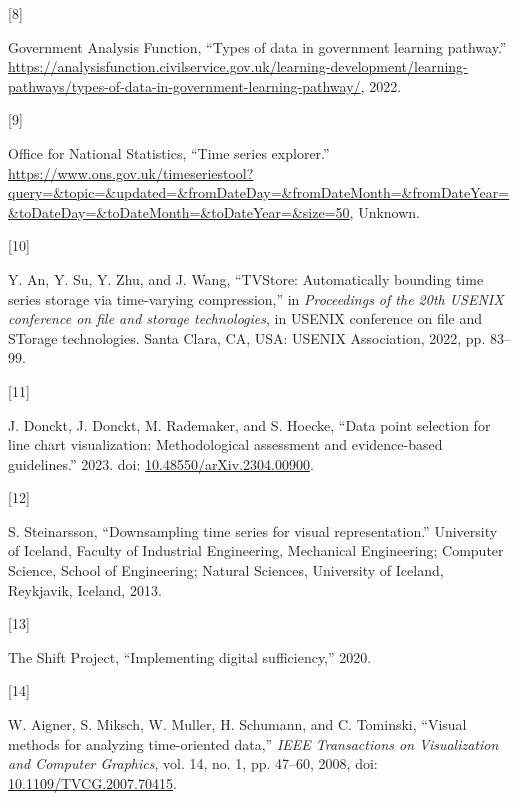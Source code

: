 \documentclass{article}
\newlength{\cslhangindent}
\newlength{\csllabelwidth}
\newlength{\cslentryspacingunit} %
\newenvironment{CSLReferences}[2] %
 {%
  \setlength{\parindent}{0pt}
  \ifodd #1
  \let\oldpar\par
  \def\par{\hangindent=\cslhangindent\oldpar}
  \fi
  \setlength{\parskip}{#2\cslentryspacingunit}
 }%
 {}
\newcommand{\CSLLeftMargin}[1]{\parbox[t]{\csllabelwidth}{#1}}
\newcommand{\CSLRightInline}[1]{\parbox[t]{\linewidth - \csllabelwidth}{#1}\break}
\begin{document}
\begin{CSLReferences}{0}{0}
\leavevmode{}%
\CSLLeftMargin{{[}8{]} }%
\CSLRightInline{Government Analysis Function, {``Types of data in
government learning pathway.''}
\url{https://analysisfunction.civilservice.gov.uk/learning-development/learning-pathways/types-of-data-in-government-learning-pathway/},
2022.}

\leavevmode{}%
\CSLLeftMargin{{[}9{]} }%
\CSLRightInline{Office for National Statistics, {``Time series
explorer.''}
\url{https://www.ons.gov.uk/timeseriestool?query=\&topic=\&updated=\&fromDateDay=\&fromDateMonth=\&fromDateYear=\&toDateDay=\&toDateMonth=\&toDateYear=\&size=50},
Unknown.}

\leavevmode{}%
\CSLLeftMargin{{[}10{]} }%
\CSLRightInline{Y. An, Y. Su, Y. Zhu, and J. Wang, {``TVStore:
Automatically bounding time series storage via time-varying
compression,''} in \emph{Proceedings of the 20th USENIX conference on
file and storage technologies}, in USENIX conference on file and STorage
technologies. Santa Clara, CA, USA: USENIX Association, 2022, pp.
83--99.}

\leavevmode{}%
\CSLLeftMargin{{[}11{]} }%
\CSLRightInline{J. Donckt, J. Donckt, M. Rademaker, and S. Hoecke,
{``Data point selection for line chart visualization: Methodological
assessment and evidence-based guidelines.''} 2023. doi:
\href{https://doi.org/10.48550/arXiv.2304.00900}{10.48550/arXiv.2304.00900}.}

\leavevmode{}%
\CSLLeftMargin{{[}12{]} }%
\CSLRightInline{S. Steinarsson, {``Downsampling time series for visual
representation.''} University of Iceland, Faculty of Industrial
Engineering, Mechanical Engineering; Computer Science, School of
Engineering; Natural Sciences, University of Iceland, Reykjavik,
Iceland, 2013.}

\leavevmode{}%
\CSLLeftMargin{{[}13{]} }%
\CSLRightInline{The Shift Project, {``Implementing digital
sufficiency,''} 2020.}

\leavevmode{}%
\CSLLeftMargin{{[}14{]} }%
\CSLRightInline{W. Aigner, S. Miksch, W. Muller, H. Schumann, and C.
Tominski, {``Visual methods for analyzing time-oriented data,''}
\emph{IEEE Transactions on Visualization and Computer Graphics}, vol.
14, no. 1, pp. 47--60, 2008, doi:
\href{https://doi.org/10.1109/TVCG.2007.70415}{10.1109/TVCG.2007.70415}.}


\end{CSLReferences}
\end{document}

